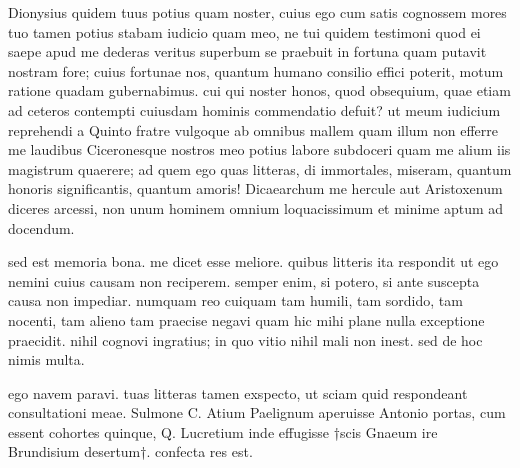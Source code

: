 


 Dionysius quidem tuus potius quam noster, cuius ego cum satis cognossem mores tuo tamen potius stabam iudicio quam meo, ne tui quidem testimoni quod ei saepe apud me dederas veritus superbum se praebuit in fortuna quam putavit nostram fore; cuius fortunae nos, quantum humano consilio effici poterit, motum ratione quadam gubernabimus. cui qui noster honos, quod obsequium, quae etiam ad ceteros contempti cuiusdam hominis commendatio defuit? ut meum iudicium reprehendi a Quinto fratre vulgoque ab omnibus mallem quam illum non efferre me laudibus Ciceronesque nostros meo potius labore subdoceri quam me alium iis magistrum quaerere; ad quem ego quas litteras, di immortales, miseram, quantum honoris significantis, quantum amoris! Dicaearchum me hercule aut Aristoxenum diceres arcessi, non unum hominem omnium loquacissimum et minime aptum ad docendum.

 sed est memoria bona. me dicet esse meliore. quibus litteris ita respondit ut ego nemini cuius causam non reciperem. semper enim, si potero, si ante suscepta causa non impediar. numquam reo cuiquam tam humili, tam sordido, tam nocenti, tam alieno tam praecise negavi quam hic mihi plane nulla exceptione praecidit. nihil cognovi ingratius; in quo vitio nihil mali non inest. sed de hoc nimis multa.

 ego navem paravi. tuas litteras tamen exspecto, ut sciam quid respondeant consultationi meae. Sulmone C. Atium Paelignum aperuisse Antonio portas, cum essent cohortes quinque, Q. Lucretium inde effugisse †scis Gnaeum ire Brundisium desertum†. confecta res est.
